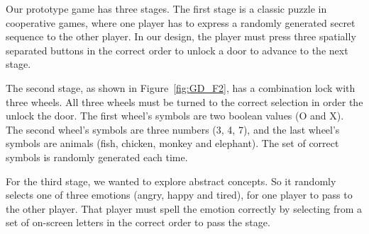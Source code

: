 


Our prototype game has three stages. The first stage is a classic puzzle in cooperative games, where one player has to express a randomly generated secret sequence to the other player. In our design, the player must press three spatially separated buttons in the correct order to unlock a door to advance to the next stage.


The second stage, as shown in Figure~\ref{fig:GD_F2}, has a combination lock with three wheels. All three wheels must be turned to the correct selection in order the unlock the door. The first wheel's symbols are two boolean values (O and X). The second wheel's symbols are three numbers (3, 4, 7), and the last wheel's symbols are animals (fish, chicken, monkey and elephant). The set of correct symbols is randomly generated each time.


For the third stage, we wanted to explore abstract concepts. So it randomly selects one of three emotions (angry, happy and tired), for one player to pass to the other player. That player must spell the emotion correctly by selecting from a set of on-screen letters in the correct order to pass the stage.
